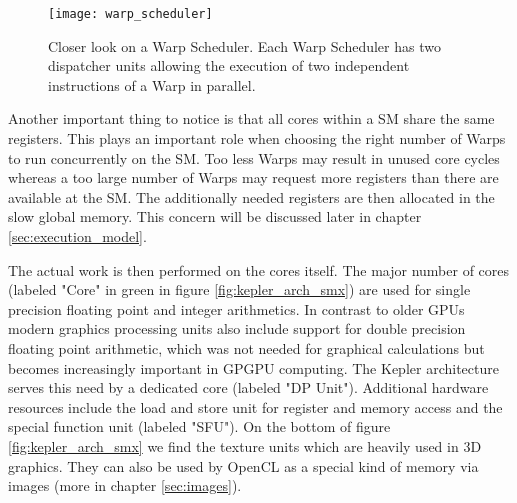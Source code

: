 \begin{figure}
\centering
\texttt{[image: warp\_scheduler]}
\caption{Closer look on a Warp Scheduler. Each Warp Scheduler has two dispatcher units allowing the execution of two independent instructions of a Warp in parallel. \cite{kepler_arch}}
\label{fig:warp_scheduler}
\end{figure}

Another important thing to notice is that all cores within a SM share the same registers. This plays an important role when choosing the right number of Warps to run concurrently on the SM. Too less Warps may result in unused core cycles whereas a too large number of Warps may request more registers than there are available at the SM. The additionally needed registers are then allocated in the slow global memory. This concern will be discussed later in chapter \ref{sec:execution_model}.

The actual work is then performed on the cores itself. The major number of cores (labeled "Core" in green in figure \ref{fig:kepler_arch_smx}) are used for single precision floating point and integer arithmetics. In contrast to older GPUs modern graphics processing units also include support for double precision floating point arithmetic, which was not needed for graphical calculations but becomes increasingly important in GPGPU computing. The Kepler architecture serves this need by a dedicated core (labeled "DP Unit"). Additional hardware resources include the load and store unit for register and memory access and the special function unit (labeled "SFU"). On the bottom of figure \ref{fig:kepler_arch_smx} we find the texture units which are heavily used in 3D graphics. They can also be used by OpenCL as a special kind of memory via images (more in chapter \ref{sec:images}).


